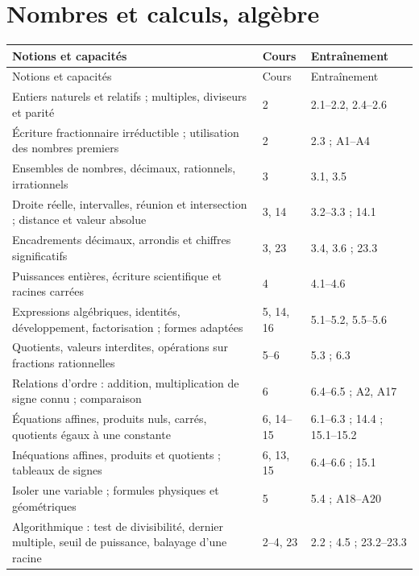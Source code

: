 \documentclass[11pt,a4paper,oneside]{book}
\begin{document}
\section{Nombres et calculs, algèbre}
\small
\begin{longtable}{p{}p{}p{}}
\toprule Notions et capacités & Cours & Entraînement\\\midrule
\endfirsthead\toprule Notions et capacités & Cours & Entraînement\\\midrule\endhead
Entiers naturels et relatifs ; multiples, diviseurs et parité & 2 & 2.1--2.2, 2.4--2.6\\
Écriture fractionnaire irréductible ; utilisation des nombres premiers & 2 & 2.3 ; A1--A4\\
Ensembles de nombres, décimaux, rationnels, irrationnels & 3 & 3.1, 3.5\\
Droite réelle, intervalles, réunion et intersection ; distance et valeur absolue & 3, 14 & 3.2--3.3 ; 14.1\\
Encadrements décimaux, arrondis et chiffres significatifs & 3, 23 & 3.4, 3.6 ; 23.3\\
Puissances entières, écriture scientifique et racines carrées & 4 & 4.1--4.6\\
Expressions algébriques, identités, développement, factorisation ; formes adaptées & 5, 14, 16 & 5.1--5.2, 5.5--5.6\\
Quotients, valeurs interdites, opérations sur fractions rationnelles & 5--6 & 5.3 ; 6.3\\
Relations d'ordre : addition, multiplication de signe connu ; comparaison & 6 & 6.4--6.5 ; A2, A17\\
Équations affines, produits nuls, carrés, quotients égaux à une constante & 6, 14--15 & 6.1--6.3 ; 14.4 ; 15.1--15.2\\
Inéquations affines, produits et quotients ; tableaux de signes & 6, 13, 15 & 6.4--6.6 ; 15.1\\
Isoler une variable ; formules physiques et géométriques & 5 & 5.4 ; A18--A20\\
Algorithmique : test de divisibilité, dernier multiple, seuil de puissance, balayage d'une racine & 2--4, 23 & 2.2 ; 4.5 ; 23.2--23.3\\
\bottomrule\end{longtable}
\normalsize
\end{document}
